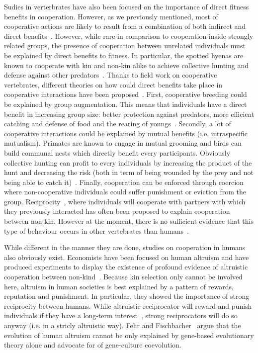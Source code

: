     Sudies in verterbrates have also been focused on the importance of direct fitness benefits in cooperation. However, as we previously mentioned, most of cooperative actions are likely to result from a combination of both indirect and direct benefits~\parencite{Clutton-Brock2009}. However, while rare in comparison to cooperation inside strongly related groups, the presence of cooperation between unrelated individuals must be explained by direct benefits to fitness. In particular, the spotted hyenas are known to cooperate with kin and non-kin alike to achieve collective hunting and defense against other predators~\parencite{Drea2009a, Smith2010, Smith2012a}. Thanks to field work on cooperative vertebrates, different theories on how could direct benefits take place in cooperative interactions have been proposed~\parencite{Clutton-Brock2002}. First, cooperative breeding could be explained by group augmentation. This means that individuals have a direct benefit in increasing group size: better protection against predators, more efficient catching and defense of food and the rearing of youngs~\parencite{Packer2001}. Secondly, a lot of cooperative interactions could be explained by mutual benefits (i.e. intraspecific mutualism). Primates are known to engage in mutual grooming and birds can build communal nests which directly benefit every participants. Obviously collective hunting can profit to every individuals by increasing the product of the hunt and decreasing the risk (both in term of being wounded by the prey and not being able to catch it)~\parencite{Scheel1991}. Finally, cooperation can be enforced through coercion where non-cooperative individuals could suffer punishment or eviction from the group. Reciprocity~\parencite{Trivers1971}, where individuals will cooperate with partners with which they previously interacted has often been proposed to explain cooperation between non-kin. However at the moment, there is no sufficient evidence that this type of behaviour occurs in other vertebrates than humans~\parencite{Hammerstein2003, Clutton-Brock2009, Andre2014}.


    While different in the manner they are done, studies on cooperation in humans also obviously exist. Economists have been focused on human altruism and have produced experiments to display the existence of profound evidence of altruistic cooperation between non-kind~\parencite{Fehr2002, Fehr2003a}. Because kin selection only cannot be involved here, altruism in human societies is best explained by a pattern of rewards, reputation and punishment. In particular, they showed the importance of strong reciprocity between humans. While altruistic reciprocator will reward and punish individuals if they have a long-term interest~\parencite{Trivers1971}, strong reciprocators will do so anyway (i.e. in a stricly altruistic way). Fehr and Fischbacher~\parencite{Fehr2003a} argue that the evolution of human altruism cannot be only explained by gene-based evolutionary theory alone and advocate for of gene-culture coevolution.

